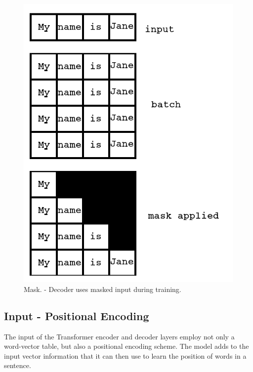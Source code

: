 \begin{figure}[H]
	\begin{center}
		
		
		\includegraphics[scale=1.25]{diagram-mask01}
	\end{center}
	\caption[Decoder Mask]{Mask. - Decoder uses masked input during training.}
	
	
\end{figure}



\subsection{Input - Positional Encoding}
The input of the Transformer encoder and decoder layers employ not only a word-vector table, but also a positional encoding scheme. The model adds to the input vector information that it can then use to learn the position of words in a sentence. 

